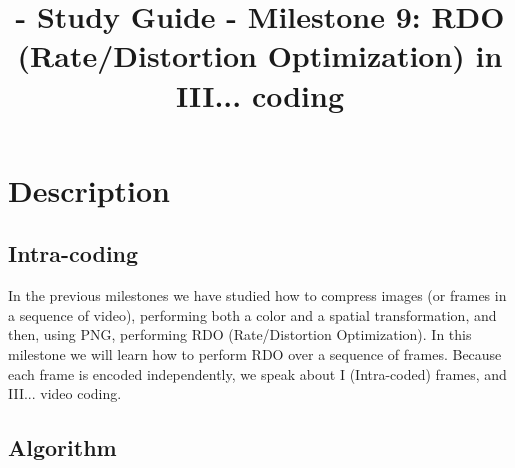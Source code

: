 
\title{\SM{} - Study Guide - Milestone 9: RDO (Rate/Distortion Optimization) in III... coding}

\maketitle

\tableofcontents

\section{Description}

\subsection{Intra-coding}

In the previous milestones we have studied how to compress images (or
frames in a sequence of video), performing both a color and a spatial
transformation, and then, using PNG, performing RDO (Rate/Distortion
Optimization). In this milestone we will learn how to perform RDO over
a sequence of frames. Because each frame is encoded independently, we
speak about I (Intra-coded) frames, and III... video coding.

\subsection{Algorithm}

